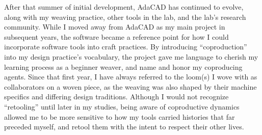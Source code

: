 
After that summer of initial development, AdaCAD has continued to evolve, along with my weaving practice, other tools in the lab, and the lab's research community. While I moved away from AdaCAD as my main project in subsequent years, the software became a reference point for how I could incorporate software tools into craft practices. By introducing ``coproduction'' into my design practice's vocabulary, the project gave me language to cherish my learning process as a beginner weaver, and name and honor my coproducing agents. Since that first year, I have always referred to the loom(s) I wove with as collaborators on a woven piece, as the weaving was also shaped by their machine specifics and differing design traditions. Although I would not recognize ``retooling'' until later in my studies, being aware of coproductive dynamics allowed me to be more sensitive to how my tools carried histories that far preceded myself, and retool them with the intent to respect their other lives. 
